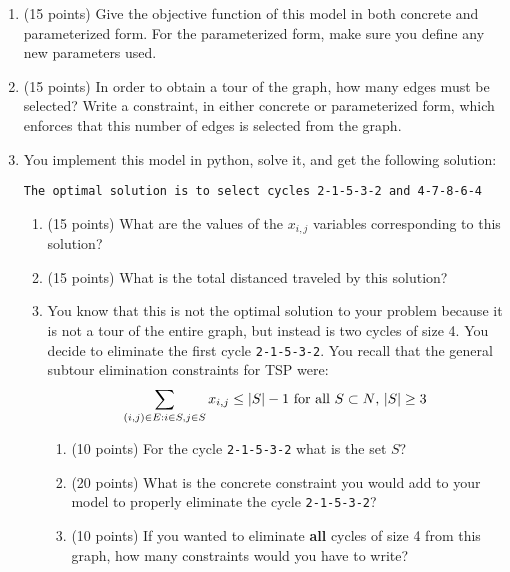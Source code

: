 \documentclass[letterpaper,oneside,12pt]{article}%
\begin{document}
\begin{enumerate}
\item (15 points) Give the objective function of this model in both concrete and parameterized form. For the parameterized form, make sure you define any new parameters used. \vspace{2in}
\item (15 points) In order to obtain a tour of the graph, how many edges must be selected? Write a constraint, in either concrete or parameterized form, which enforces that this number of edges is selected from the graph. \vfill

\newpage

\item You implement this model in python, solve it, and get the following solution:

	\verb|The optimal solution is to select cycles 2-1-5-3-2 and 4-7-8-6-4|
		\begin{enumerate}
		\item (15 points) What are the values of the $x_{i,j}$ variables corresponding to this solution? \vfill
		\item (15 points) What is the total distanced traveled by this solution? \vfill 
		\item You know that this is not the optimal solution to your problem because it is not a tour of the entire graph, but instead is two cycles of size 4. You decide to eliminate the first cycle \verb|2-1-5-3-2|. You recall that the general subtour elimination constraints for TSP were:
		\[
		\sum_{(i,j) \in E: \\ i \in S, j \in S} x_{i,j} \leq |S| - 1 \text{ for all $S \subset N$, $|S| \geq 3$}
		\]
			\begin{enumerate}
			\item (10 points) For the cycle \verb|2-1-5-3-2| what is the set $S$? \vspace{1in}
			\item (20 points) What is the concrete constraint you would add to your model to properly eliminate the cycle \verb|2-1-5-3-2|? \vspace{2in}
			\item (10 points) If you wanted to eliminate \textbf{all} cycles of size 4 from this graph, how many constraints would you have to write? \vfill
			\end{enumerate}
		\end{enumerate}
\end{enumerate}
\end{document}
